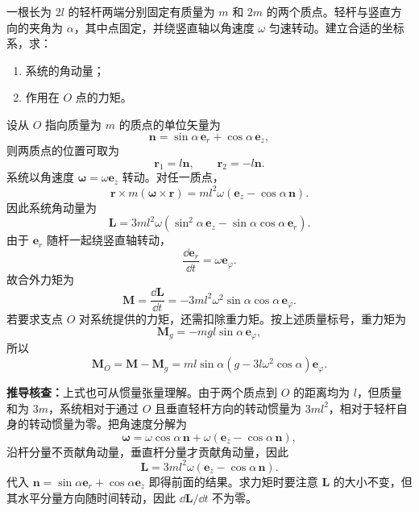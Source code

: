 
\begin{question}[旋转轻杆的角动量]
一根长为 $2l$ 的轻杆两端分别固定有质量为 $m$ 和 $2m$ 的两个质点。轻杆与竖直方向的夹角为 $\alpha$，其中点固定，并绕竖直轴以角速度 $\omega$ 匀速转动。建立合适的坐标系，求：
\begin{enumerate}
  \item 系统的角动量；
  \item 作用在 $O$ 点的力矩。
\end{enumerate}

\begin{solution}
设从 $O$ 指向质量为 $m$ 的质点的单位矢量为
\[
  \boldsymbol n=\sin\alpha\,\boldsymbol e_r+
  \cos\alpha\,\boldsymbol e_z,
\]
则两质点的位置可取为
\[
  \boldsymbol r_1=l\boldsymbol n,
  \qquad
  \boldsymbol r_2=-l\boldsymbol n.
\]
系统以角速度 $\boldsymbol\omega=\omega\boldsymbol e_z$ 转动。对任一质点，
\[
  \boldsymbol r\times m(\boldsymbol\omega\times\boldsymbol r)
  =m l^2\omega(\boldsymbol e_z-\cos\alpha\,\boldsymbol n).
\]
因此系统角动量为
\[
  \boxed{\boldsymbol L=3ml^2\omega
  \left(\sin^2\alpha\,\boldsymbol e_z
  -\sin\alpha\cos\alpha\,\boldsymbol e_r\right)}.
\]
由于 $\boldsymbol e_r$ 随杆一起绕竖直轴转动，
\[
  \frac{\dd\boldsymbol e_r}{\dd t}=\omega\boldsymbol e_\varphi .
\]
故合外力矩为
\[
  \boxed{\boldsymbol M=\frac{\dd\boldsymbol L}{\dd t}
  =-3ml^2\omega^2\sin\alpha\cos\alpha\,\boldsymbol e_\varphi}.
\]
若要求支点 $O$ 对系统提供的力矩，还需扣除重力矩。按上述质量标号，重力矩为
\[
  \boldsymbol M_g=-mgl\sin\alpha\,\boldsymbol e_\varphi,
\]
所以
\[
  \boldsymbol M_O=\boldsymbol M-\boldsymbol M_g
  =m l\sin\alpha\left(g-3l\omega^2\cos\alpha\right)\boldsymbol e_\varphi .
\]


\medskip
\textbf{推导核查：}上式也可从惯量张量理解。由于两个质点到 $O$ 的距离均为 $l$，但质量和为 $3m$，系统相对于通过 $O$ 且垂直轻杆方向的转动惯量为 $3ml^2$，相对于轻杆自身的转动惯量为零。把角速度分解为
\[
  \boldsymbol\omega=\omega\cos\alpha\,\boldsymbol n
  +\omega\left(\boldsymbol e_z-\cos\alpha\,\boldsymbol n\right),
\]
沿杆分量不贡献角动量，垂直杆分量才贡献角动量，因此
\[
  \boldsymbol L=3ml^2\omega\left(\boldsymbol e_z-\cos\alpha\,\boldsymbol n\right).
\]
代入 $\boldsymbol n=\sin\alpha\boldsymbol e_r+\cos\alpha\boldsymbol e_z$ 即得前面的结果。求力矩时要注意 $\boldsymbol L$ 的大小不变，但其水平分量方向随时间转动，因此 $\dd\boldsymbol L/\dd t$ 不为零。
\end{solution}
\end{question}

